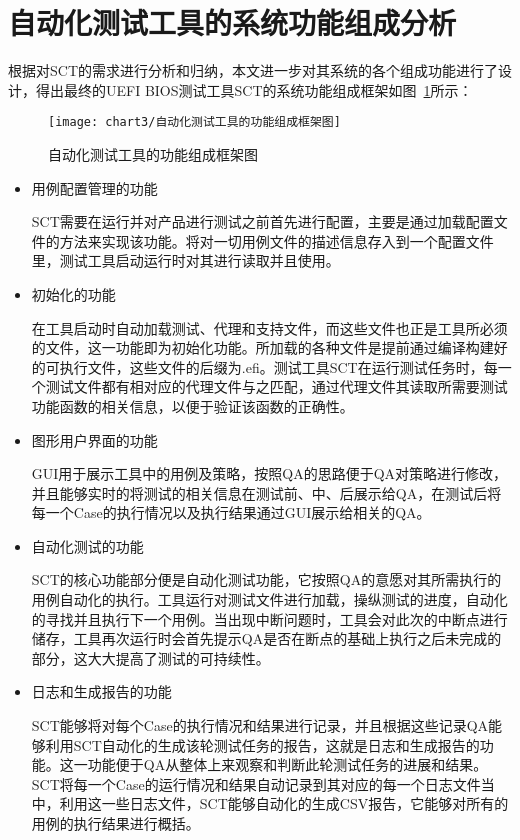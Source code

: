 \section{自动化测试工具的系统功能组成分析}

	根据对SCT的需求进行分析和归纳，本文进一步对其系统的各个组成功能进行了设计，得出最终的UEFI BIOS测试工具SCT的系统功能组成框架如图~\ref{fig:自动化测试工具的功能组成框架图}所示：
	
	\begin{figure}[H] %
		\centering
		\texttt{[image: chart3/自动化测试工具的功能组成框架图]}
		\caption{自动化测试工具的功能组成框架图}
		\label{fig:自动化测试工具的功能组成框架图}
	\end{figure}
	
	\begin{itemize}
		\item 用例配置管理的功能
		
		SCT需要在运行并对产品进行测试之前首先进行配置，主要是通过加载配置文件的方法来实现该功能。将对一切用例文件的描述信息存入到一个配置文件里，测试工具启动运行时对其进行读取并且使用。
		\item 初始化的功能
		
		在工具启动时自动加载测试、代理和支持文件，而这些文件也正是工具所必须的文件，这一功能即为初始化功能。所加载的各种文件是提前通过编译构建好的可执行文件，这些文件的后缀为.efi。测试工具SCT在运行测试任务时，每一个测试文件都有相对应的代理文件与之匹配，通过代理文件其读取所需要测试功能函数的相关信息，以便于验证该函数的正确性。
		\item 图形用户界面的功能
		
		GUI用于展示工具中的用例及策略，按照QA的思路便于QA对策略进行修改，并且能够实时的将测试的相关信息在测试前、中、后展示给QA，在测试后将每一个Case的执行情况以及执行结果通过GUI展示给相关的QA。
		\item 自动化测试的功能
		
		SCT的核心功能部分便是自动化测试功能，它按照QA的意愿对其所需执行的用例自动化的执行。工具运行对测试文件进行加载，操纵测试的进度，自动化的寻找并且执行下一个用例。当出现中断问题时，工具会对此次的中断点进行储存，工具再次运行时会首先提示QA是否在断点的基础上执行之后未完成的部分，这大大提高了测试的可持续性。
		\item 日志和生成报告的功能
		
		SCT能够将对每个Case的执行情况和结果进行记录，并且根据这些记录QA能够利用SCT自动化的生成该轮测试任务的报告，这就是日志和生成报告的功能。这一功能便于QA从整体上来观察和判断此轮测试任务的进展和结果。SCT将每一个Case的运行情况和结果自动记录到其对应的每一个日志文件当中，利用这一些日志文件，SCT能够自动化的生成CSV报告，它能够对所有的用例的执行结果进行概括。
	\end{itemize}
	
